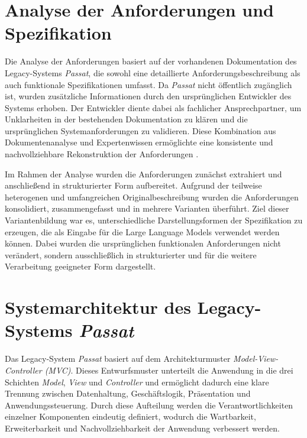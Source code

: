 \newpage
\section{Analyse der Anforderungen und Spezifikation}
Die Analyse der Anforderungen basiert auf der vorhandenen
Dokumentation des Legacy-Systems \textit{Passat}, die sowohl
eine detaillierte Anforderungsbeschreibung als auch
funktionale Spezifikationen umfasst. Da \textit{Passat} nicht
öffentlich zugänglich ist, wurden zusätzliche Informationen durch den ursprünglichen Entwickler des Systems erhoben. Der Entwickler diente dabei als fachlicher Ansprechpartner,
um Unklarheiten in der bestehenden Dokumentation zu klären
und die ursprünglichen Systemanforderungen zu validieren.
Diese Kombination aus Dokumentenanalyse und Expertenwissen
ermöglichte eine konsistente und nachvollziehbare
Rekonstruktion der Anforderungen \cite{Schmalz2026}.

Im Rahmen der Analyse wurden die Anforderungen zunächst
extrahiert und anschließend in strukturierter Form
aufbereitet. Aufgrund der teilweise heterogenen und
umfangreichen Originalbeschreibung wurden die Anforderungen
konsolidiert, zusammengefasst und in mehrere Varianten
überführt. Ziel dieser Variantenbildung war es, unterschiedliche
Darstellungsformen der Spezifikation zu erzeugen, die als
Eingabe für die Large Language Models verwendet werden können. Dabei wurden die ursprünglichen funktionalen Anforderungen
nicht verändert, sondern ausschließlich in strukturierter und
für die weitere Verarbeitung geeigneter Form dargestellt.

\section{Systemarchitektur des Legacy-Systems \textit{Passat}}

Das Legacy-System \textit{Passat} basiert auf dem Architekturmuster
\textit{Model-View-Controller (MVC)}. Dieses Entwurfsmuster
unterteilt
die Anwendung in die drei Schichten \textit{Model}, \textit{View} und
\textit{Controller} und ermöglicht dadurch eine klare Trennung zwischen
Datenhaltung, Geschäftslogik, Präsentation und Anwendungssteuerung. Durch
diese Aufteilung werden die Verantwortlichkeiten einzelner Komponenten
eindeutig definiert, wodurch die Wartbarkeit, Erweiterbarkeit und
Nachvollziehbarkeit der Anwendung verbessert werden.

